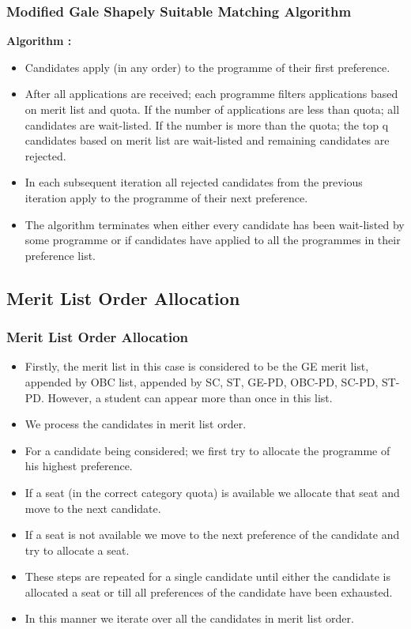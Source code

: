 \documentclass{beamer}
\begin{document}
\begin{frame}
\frametitle{Modified Gale Shapely Suitable Matching Algorithm}

{\bf Algorithm :}
\begin{itemize}
\item Candidates apply (in any order) to the programme of their first preference.
\pause
\item After all applications are received; each programme filters applications based on merit list and quota. If the number of applications are less than quota; all candidates are wait-listed. If the number is more than the quota; the top q candidates based on merit list are wait-listed and remaining candidates are rejected.
\pause
\item In each subsequent iteration all rejected candidates from the previous iteration apply to the programme of their next preference.
\pause
\item The algorithm terminates when either every candidate has been wait-listed by some programme or if candidates have applied to all the programmes in their preference list.

\end{itemize}
\end{frame}


\subsection{Merit List Order Allocation}
\begin{frame}
\frametitle{Merit List Order Allocation}

\pause
\begin {itemize}
\item Firstly, the merit list in this case is considered to be the GE merit list, appended by OBC list, appended by SC, ST, GE-PD, OBC-PD, SC-PD, ST-PD. However, a student can appear more than once in this list.
\pause
\item We process the candidates in merit list order.
\pause
\item For a candidate being considered; we first try to allocate the programme of his highest preference.
\pause
\item If a seat (in the correct category quota) is available we allocate that seat and move to the next candidate.
\pause
\item If a seat is not available we move to the next preference of the candidate and try to allocate a seat.
\pause
\item These steps are repeated for a single candidate until either the candidate is allocated a seat or till all preferences of the candidate have been exhausted.
\pause
\item In this manner we iterate over all the candidates in merit list order.
\end{itemize}
\end{frame}
\end{document}
